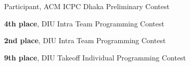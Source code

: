 %
%
%


\begin{scholarship}
        {Participant, ACM ICPC Dhaka Preliminary Contest}

        {\textbf{4th place}, DIU Intra Team Programming Contest}

        {\textbf{2nd place}, DIU Intra Team Programming Contest}

        {\textbf{9th place}, DIU Takeoff Individual Programming Contest}

\end{scholarship}